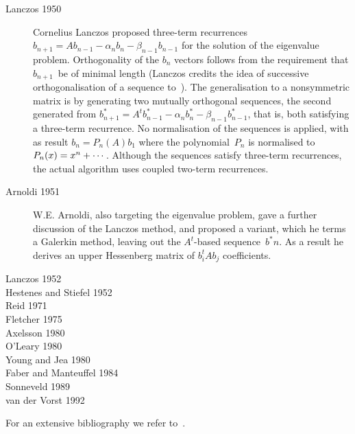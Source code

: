 \documentclass[11pt]{artikel3}
\begin{document}
\begin{Outline}
\begin{description}
    \item[Lanczos 1950~\cite{Lanczos1950:iteration_method}]
Cornelius Lanczos proposed three-term recurrences 
$b_{n+1}=Ab_{n-1}-\alpha_nb_n-\beta_{n-1}b_{n-1}$
for the solution of the eigenvalue problem. 
Orthogonality of the $b_n$ vectors follows from the requirement
that $b_{n+1}$~be of minimal length (Lanczos credits the idea
of successive orthogonalisation of a sequence to~\cite{Szaz:19}).
The generalisation to a nonsymmetric matrix is by generating
two mutually orthogonal sequences, the second generated from
$b^*_{n+1}=A^tb^*_{n-1}-\alpha_nb^*_n-\beta_{n-1}b^*_{n-1}$,
that is, both satisfying a three-term recurrence.
No normalisation of the sequences is applied, with as result
$b_n=P_n(A)b_1$ where the polynomial~$P_n$ is normalised to
$P_n(x)=\nobreak x^n+\nobreak\cdots$.
Although the sequences satisfy three-term recurrences, the
actual algorithm uses coupled two-term recurrences.
    \item[Arnoldi 1951~\cite{Arnoldi1951:minimized_iterations}]
W.E. Arnoldi, also targeting the eigenvalue problem,
gave a further discussion of the Lanczos method,
and proposed a variant, which he terms a Galerkin method,
leaving out the $A^t$-based sequence~$b^*n$. As a result he
derives an upper Hessenberg matrix of $b_i^tAb_j$ coefficients.
    \item[Lanczos 1952~\cite{Lanczos1952:solution_of_systems}]
    \item[Hestenes and Stiefel 1952~\cite{HestenesStiefel1952:cg}]
    \item[Reid 1971~\cite{Reid1971:cg}]
    \item[Fletcher 1975~\cite{Fletcher1975:indefinite}]
    \item[Axelsson 1980 \cite{Ax:unsymmetricinconsistent}]
    \item[O'Leary 1980~\cite{OLeary1980:blockcg}]
    \item[Young and Jea 1980~\cite{YoungJea1980:generalizedcg}]
    \item[Faber and Manteuffel 1984~%
\cite{FaberManteuffel:conditions-for-existence}]
    \item[Sonneveld 1989~\cite{Sonneveld1989:cgs}]
    \item[van der Vorst 1992~\cite{vdVorst1992:bicgstab}]
\end{description}

For an extensive bibliography we refer to~\cite{GoOLe:cghist}.

\begin{comment}
\Level 0 {Conclusion}


\end{comment}
\end{Outline}
\end{document}
